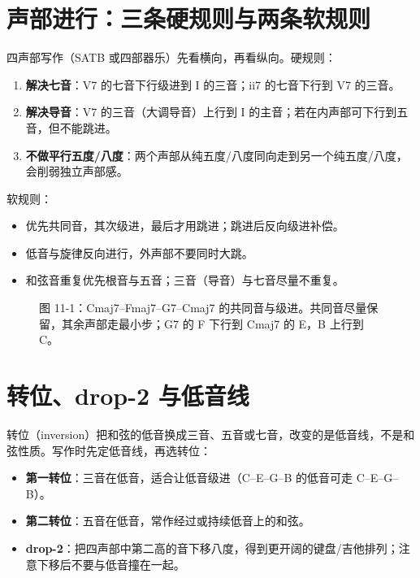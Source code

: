 \section{声部进行：三条硬规则与两条软规则}

四声部写作（SATB 或四部器乐）先看横向，再看纵向。硬规则：

\begin{enumerate}
  \item \textbf{解决七音}：V7 的七音下行级进到 I 的三音；ii7 的七音下行到 V7 的三音。
  \item \textbf{解决导音}：V7 的三音（大调导音）上行到 I 的主音；若在内声部可下行到五音，但不能跳进。
  \item \textbf{不做平行五度/八度}：两个声部从纯五度/八度同向走到另一个纯五度/八度，会削弱独立声部感。
\end{enumerate}

软规则：

\begin{itemize}
  \item 优先共同音，其次级进，最后才用跳进；跳进后反向级进补偿。
  \item 低音与旋律反向进行，外声部不要同时大跳。
  \item 和弦音重复优先根音与五音；三音（导音）与七音尽量不重复。
\end{itemize}

\begin{figure}[htbp]
\centering
{}
\caption*{图 11-1：Cmaj7--Fmaj7--G7--Cmaj7 的共同音与级进。共同音尽量保留，其余声部走最小步；G7 的 F 下行到 Cmaj7 的 E，B 上行到 C。}
\end{figure}

\section{转位、drop-2 与低音线}

转位（inversion）把和弦的低音换成三音、五音或七音，改变的是低音线，不是和弦性质。写作时先定低音线，再选转位：

\begin{itemize}
  \item \textbf{第一转位}：三音在低音，适合让低音级进（C--E--G--B 的低音可走 C--E--G--B）。
  \item \textbf{第二转位}：五音在低音，常作经过或持续低音上的和弦。
  \item \textbf{drop-2}：把四声部中第二高的音下移八度，得到更开阔的键盘/吉他排列；注意下移后不要与低音撞在一起。
\end{itemize}

